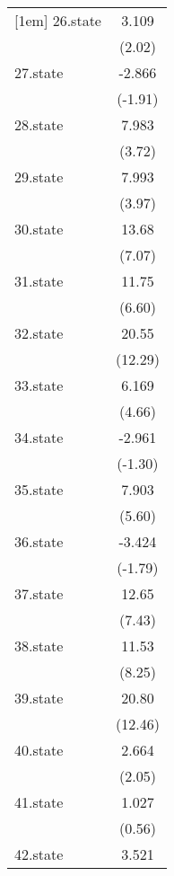 {\begin{tabular}{l*{1}{c}}
[1em]
26.state    &       3.109\sym{*}  \\
            &      (2.02)         \\
[1em]
27.state    &      -2.866         \\
            &     (-1.91)         \\
[1em]
28.state    &       7.983\sym{***}\\
            &      (3.72)         \\
[1em]
29.state    &       7.993\sym{***}\\
            &      (3.97)         \\
[1em]
30.state    &       13.68\sym{***}\\
            &      (7.07)         \\
[1em]
31.state    &       11.75\sym{***}\\
            &      (6.60)         \\
[1em]
32.state    &       20.55\sym{***}\\
            &     (12.29)         \\
[1em]
33.state    &       6.169\sym{***}\\
            &      (4.66)         \\
[1em]
34.state    &      -2.961         \\
            &     (-1.30)         \\
[1em]
35.state    &       7.903\sym{***}\\
            &      (5.60)         \\
[1em]
36.state    &      -3.424         \\
            &     (-1.79)         \\
[1em]
37.state    &       12.65\sym{***}\\
            &      (7.43)         \\
[1em]
38.state    &       11.53\sym{***}\\
            &      (8.25)         \\
[1em]
39.state    &       20.80\sym{***}\\
            &     (12.46)         \\
[1em]
40.state    &       2.664\sym{*}  \\
            &      (2.05)         \\
[1em]
41.state    &       1.027         \\
            &      (0.56)         \\
[1em]
42.state    &       3.521         \\

\end{tabular}}
